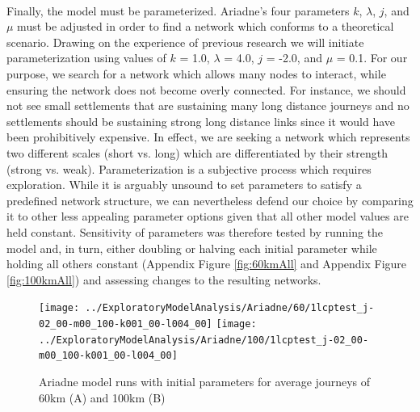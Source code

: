 \documentclass[12pt,a4paper]{thesis}
\begin{document}
\paragraph{}
Finally, the model must be parameterized. Ariadne's four parameters $k$, $\lambda$, $j$, and $\mu$ must be adjusted in order to find a network which conforms to a theoretical scenario. Drawing on the experience of previous research \citep{KnaRivEva11} we will initiate parameterization using values of $k$ = 1.0, $\lambda$ = 4.0, $j$ = -2.0, and $\mu$ = 0.1. For our purpose, we search for a network which allows many nodes to interact, while ensuring the network does not become overly connected. For instance, we should not see small settlements that are sustaining many long distance journeys and no settlements should be sustaining strong long distance links since it would have been prohibitively expensive. In effect, we are seeking a network which represents two different scales (short vs. long) which are differentiated by their strength (strong vs. weak). Parameterization is a subjective process which requires exploration. While it is arguably unsound to set parameters to satisfy a predefined network structure, we can nevertheless defend our choice by comparing it to other less appealing parameter options given that all other model values are held constant. Sensitivity of parameters was therefore tested by running the model and, in turn, either doubling or halving each initial parameter while holding all others constant (Appendix Figure \ref{fig:60kmAll} and Appendix Figure \ref{fig:100kmAll}) and assessing changes to the resulting networks.

\begin{figure}
\centering
\texttt{[image: ../ExploratoryModelAnalysis/Ariadne/60/1lcptest\_j-02\_00-m00\_100-k001\_00-l004\_00]}
\texttt{[image: ../ExploratoryModelAnalysis/Ariadne/100/1lcptest\_j-02\_00-m00\_100-k001\_00-l004\_00]}
\caption{Ariadne model runs with initial parameters for average journeys of 60km (A) and 100km (B)}
\label{fig:initParams}
\end{figure}
\end{document}
